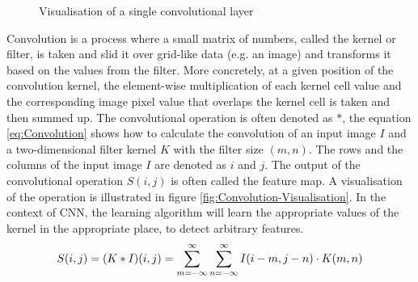 \begin{figure}[htbp]
    \captionsetup{format=plain}
    \centering
    \caption{Visualisation of a single convolutional layer}
    \label{fig:Convolution-Layer-Visualisation}
\end{figure}
\noindent
Convolution is a process where a small matrix of numbers, called the kernel or filter, is taken and slid it over grid-like data (e.g. an image) and transforms it based on the values from the filter. More concretely, at a given position of the convolution kernel, the element-wise multiplication of each kernel cell value and the corresponding image pixel value that overlaps the kernel cell is taken and then summed up. The convolutional operation is often denoted as $\ast$, the equation \ref{eq:Convolution} shows how to calculate the convolution of an input image $I$ and a two-dimensional filter kernel $K$ with the filter size $(m, n)$. The rows and the columns of the input image $I$ are denoted as $i$ and $j$. The output of the convolutional operation $S(i,j)$ is often called the feature map. A visualisation of the operation is illustrated in figure \ref{fig:Convolution-Visualisation}. In the context of \gls{CNN}, the learning algorithm will learn the appropriate values of the kernel in the appropriate place, to detect arbitrary features.
\begin{equation}
    \centering
    S(i,j) = (K \ast I)(i,j) = \sum_{m=-\infty}^\infty \sum_{n=-\infty}^\infty I(i-m, j-n) \cdot K(m,n)
    \label{eq:Convolution}
\end{equation}
